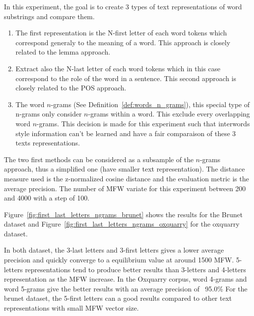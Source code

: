 In this experiment, the goal is to create 3 types of text representations of word substrings and compare them.

\begin{enumerate}
  \item
  The first representation is the N-first letter of each word tokens which correspond generaly to the meaning of a word.
  This approach is closely related to the lemma approach.
  \item
  Extract also the N-last letter of each word tokens which in this case correspond to the role of the word in a sentence.
  This second approach is closely related to the POS approach.
  \item
  The word $n$-grams (See Definition~\ref{def:words_n_grams}), this special type of n-grams only consider $n$-grams within a word.
  This exclude every overlapping word $n$-grams.
  This decision is made for this experiment such that interwords style information can't be learned and have a fair comparaison of these 3 texts representations.
\end{enumerate}
The two first methods can be considered as a subsample of the $n$-grams approach, thus a simplified one (have smaller text representation).
The distance measure used is the z-normalized cosine distance and the evaluation metric is the average precision.
The number of MFW variate for this experiment between 200 and 4000 with a step of 100.

Figure~\ref{fig:first_last_letters_ngrams_brunet} shows the results for the Brunet dataset and Figure~\ref{fig:first_last_letters_ngrams_oxquarry} for the oxquarry dataset.

In both dataset, the 3-last letters and 3-first letters gives a lower average precision and quickly converge to a equilibrium value at around 1500 MFW.
5-letters representations tend to produce better results than 3-letters and 4-letters representation as the MFW increase.
In the Oxquarry corpus, word 4-grams and word 5-grams give the better results with an average precision of ~95.0\%
For the brunet dataset, the 5-first letters can a good results compared to other text representations with small MFW vector size.

